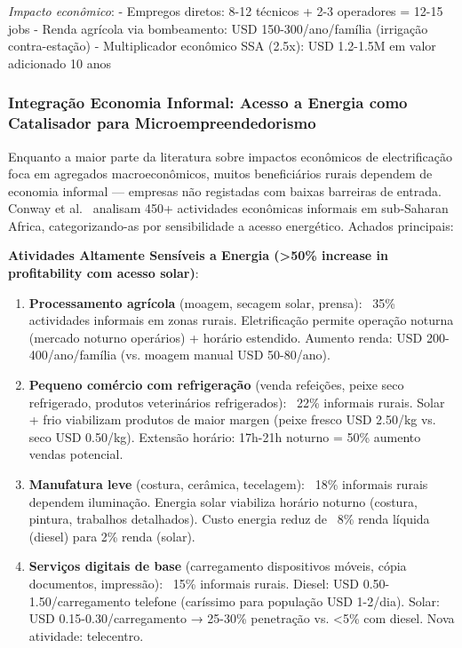 \documentclass[12pt, a4paper]{article}
\begin{document}
{{{{{{{{{{{\textit{Impacto econômico}:
- Empregos diretos: 8-12 técnicos + 2-3 operadores = 12-15 jobs
- Renda agrícola via bombeamento: USD 150-300/ano/família (irrigação contra-estação)
- Multiplicador econômico SSA (2.5x): USD 1.2-1.5M em valor adicionado 10 anos

\subsubsection{Integração Economia Informal: Acesso a Energia como Catalisador para Microempreendedorismo}

Enquanto a maior parte da literatura sobre impactos econômicos de electrificação foca em agregados macroeconômicos, muitos beneficiários rurais dependem de economia informal — empresas não registadas com baixas barreiras de entrada. Conway et al.~\citep{Conway2019} analisam 450+ actividades econômicas informais em sub-Saharan Africa, categorizando-as por sensibilidade a acesso energético. Achados principais:

\textbf{Atividades Altamente Sensíveis a Energia (>50\% increase in profitability com acesso solar)}:
\begin{enumerate}
\item \textbf{Processamento agrícola} (moagem, secagem solar, prensa): ~35\% actividades informais em zonas rurais. Eletrificação permite operação noturna (mercado noturno operários) + horário estendido. Aumento renda: USD 200-400/ano/família (vs. moagem manual USD 50-80/ano).
\item \textbf{Pequeno comércio com refrigeração} (venda refeições, peixe seco refrigerado, produtos veterinários refrigerados): ~22\% informais rurais. Solar + frio viabilizam produtos de maior margen (peixe fresco USD 2.50/kg vs. seco USD 0.50/kg). Extensão horário: 17h-21h noturno = 50\% aumento vendas potencial.
\item \textbf{Manufatura leve} (costura, cerâmica, tecelagem): ~18\% informais rurais dependem iluminação. Energia solar viabiliza horário noturno (costura, pintura, trabalhos detalhados). Custo energia reduz de ~8\% renda líquida (diesel) para 2\% renda (solar).
\item \textbf{Serviços digitais de base} (carregamento dispositivos móveis, cópia documentos, impressão): ~15\% informais rurais. Diesel: USD 0.50-1.50/carregamento telefone (caríssimo para população USD 1-2/dia). Solar: USD 0.15-0.30/carregamento → 25-30\% penetração vs. <5\% com diesel. Nova atividade: telecentro.
\end{enumerate}

}}}}}}}}}}}
\end{document}
